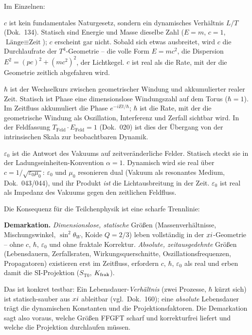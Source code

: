 Im Einzelnen:

\textbf{$c$} ist kein fundamentales Naturgesetz, sondern ein dynamisches
Verhältnis $L/T$ (Dok.~134). Statisch sind Energie und Masse dieselbe Zahl
($E=m$, $c=1$, $\text{Länge}\equiv\text{Zeit}$); $c$ erscheint gar nicht. Sobald
sich etwas ausbreitet, wird $c$ die Durchlaufrate der $T^4$-Geometrie -- die volle
Form $E=mc^2$, die Dispersion $E^2=(pc)^2+(mc^2)^2$, der Lichtkegel. $c$ ist real
als die Rate, mit der die Geometrie zeitlich abgefahren wird.

\textbf{$\hbar$} ist der Wechselkurs zwischen geometrischer Windung und
akkumulierter realer Zeit. Statisch ist Phase eine dimensionslose Windungszahl auf
dem Torus ($\hbar=1$). Im Zeitfluss akkumuliert die Phase $e^{-iEt/\hbar}$;
$\hbar$ ist die Rate, mit der die geometrische Windung als Oszillation,
Interferenz und Zerfall sichtbar wird. In der Feldfassung $T_{\text{Feld}}\cdot
E_{\text{Feld}}=1$ (Dok.~020) ist dies der Übergang von der intrinsischen Skala
zur beobachtbaren Dynamik.

\textbf{$\varepsilon_0$} ist die Antwort des Vakuums auf zeitveränderliche Felder.
Statisch steckt sie in der Ladungseinheiten-Konvention $\alpha=1$. Dynamisch wird
sie real über $c=1/\sqrt{\varepsilon_0\mu_0}$: $\varepsilon_0$ und $\mu_0$
resonieren dual (Vakuum als resonantes Medium, Dok.~043/044), und ihr Produkt
\emph{ist} die Lichtausbreitung in der Zeit. $\varepsilon_0$ ist real als
Impedanz des Vakuums gegen den zeitlichen Feldfluss.

Die Konsequenz für die Teilchenphysik ist eine scharfe Trennlinie:

\begin{prinzip}
\textbf{Demarkation.} \emph{Dimensionslose, statische} Größen
(Massenverhältnisse, Mischungswinkel, $\sin^2\theta_W$, Koide $Q=2/3$) leben
vollständig in der $xi$-Geometrie -- ohne $c$, $\hbar$, $\varepsilon_0$ und
ohne fraktale Korrektur. \emph{Absolute, zeitausgedehnte} Größen (Lebensdauern,
Zerfallsraten, Wirkungsquerschnitte, Oszillationsfrequenzen, Propagatoren)
existieren erst im Zeitfluss, erfordern $c$, $\hbar$, $\varepsilon_0$ als real und
erben damit die SI-Projektion ($S_{\mathrm{T0}}$, $K_{\text{frak}}$).
\end{prinzip}

Das ist konkret testbar: Ein Lebensdauer-\emph{Verhältnis} (zwei Prozesse,
$\hbar$ kürzt sich) ist statisch-sauber aus $xi$ ableitbar (vgl.~Dok.~160);
eine \emph{absolute} Lebensdauer trägt die dynamischen Konstanten und die
Projektionsfaktoren. Die Demarkation sagt also voraus, welche Größen FFGFT scharf
und korrekturfrei liefert und welche die Projektion durchlaufen müssen.

